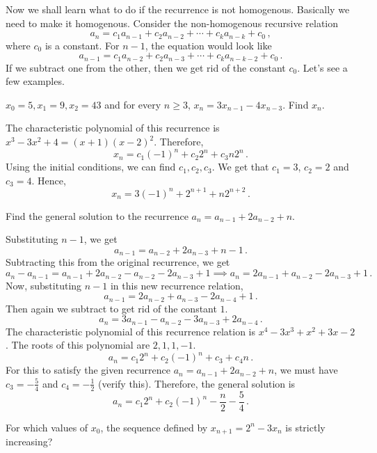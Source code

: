 \documentclass[11pt]{scrartcl}
\begin{document}
\vspace{3mm}

Now we shall learn what to do if the recurrence is not homogenous. Basically we need to make it homogenous. Consider the non-homogenous recursive relation
\[ a_n = c_1a_{n-1} + c_2 a_{n-2} + \cdots + c_k a_{n-k} + c_0 \, ,\]
where \(c_0\) is a constant. For \(n-1\), the equation would look like
\[ a_{n-1} = c_1a_{n-2} + c_2 a_{n-3} + \cdots + c_k a_{n-k-2} + c_0 \, .\]
If we subtract one from the other, then we get rid of the constant \(c_0\). Let's see a few examples.
\begin{exercise}
\(x_0 = 5, x_1 = 9 , x_2 = 43\) and for every \(n \ge 3\), \(x_n = 3x_{n-1} - 4 x_{n-3}\). Find \(x_n\).
\end{exercise}
\begin{soln}
The characteristic polynomial of this recurrence is \(x^3 - 3x^2 + 4 = \left(x+1\right) \left(x-2\right) ^2\). Therefore,
\[ x_n  =  c_1 \left(-1\right) ^n + c_2 2^n  + c_3 n 2^n \, . \]
Using the initial conditions, we can find \(c_1, c_2, c_3\). We get that \(c_1 = 3\), \(c_2 = 2\) and \(c_3 = 4\). Hence,
\[ x_n  =  3\left(-1\right) ^n + 2^{n+1}  + n 2^{n+2} \, . \]
\end{soln}
\begin{exercise}
Find the general solution to the recurrence \(a_n = a_{n-1} + 2a_{n-2} + n\).
\end{exercise}
\begin{soln}
Substituting \(n-1\), we get
\[ a_{n-1} = a_{n-2} + 2a_{n-3} + n -1 \, .\]
Subtracting this from the original recurrence, we get
\[ a_n - a_{n-1} = a_{n-1} + 2a_{n-2} - a_{n-2} - 2a_{n-3} + 1 \implies a_n = 2 a_{n-1} + a_{n-2} - 2a_{n-3} + 1 \, .  \]
Now, substituting \(n-1\) in this new recurrence relation,
\[ a_{n-1} = 2 a_{n-2} + a_{n-3} - 2a_{n-4} + 1 \, .\]
Then again we subtract to get rid of the constant \(1\).
\[ a_n = 3 a_{n-1} - a_{n-2} - 3a_{n-3} + 2 a_{n-4} \, .  \]
The characteristic polynomial of this recurrence relation is \(x^4 - 3x^3 + x^2 + 3x -2\). The roots of this polynomial are \(2, 1,1, -1\).
\[ a_n = c_1 2^n + c_2 \left(-1\right) ^n + c_3 + c_4 n \, . \]
For this to satisfy the given recurrence \(a_n = a_{n-1} + 2a_{n-2} + n\), we must have \(c_3 = - \frac{5}{4}\) and \(c_4 = -\frac{1}{2}\) (verify this). Therefore, the general solution is
\[ a_n = c_1 2^n + c_2 \left(-1\right) ^n - \frac{n}{2} - \frac{5}{4}   \, . \]
\end{soln}
\begin{exercise}
For which values of \(x_0\), the sequence defined by \(x_{n+1} = 2^n - 3x_n\) is strictly increasing?
\end{exercise}
\end{document}
